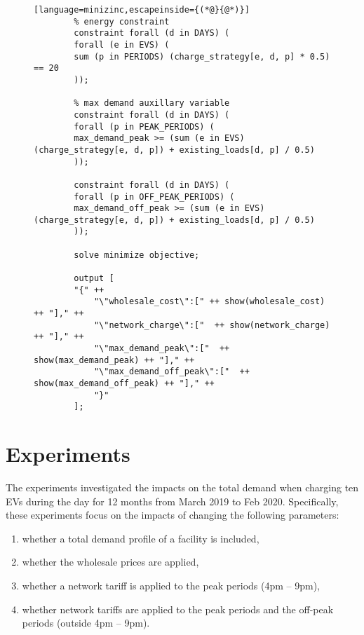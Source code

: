 \documentclass[a4paper, oneandhalfspace]{llncs}
\begin{document}
\begin{figure}[hp!]
\begin{lstlisting}[language=minizinc,escapeinside={(*@}{@*)}]
		% energy constraint
		constraint forall (d in DAYS) (
		forall (e in EVS) (
		sum (p in PERIODS) (charge_strategy[e, d, p] * 0.5) == 20
		));
		
		% max demand auxillary variable
		constraint forall (d in DAYS) (
		forall (p in PEAK_PERIODS) (
		max_demand_peak >= (sum (e in EVS) (charge_strategy[e, d, p]) + existing_loads[d, p] / 0.5)
		));
		
		constraint forall (d in DAYS) (
		forall (p in OFF_PEAK_PERIODS) (
		max_demand_off_peak >= (sum (e in EVS) (charge_strategy[e, d, p]) + existing_loads[d, p] / 0.5)
		));
		
		solve minimize objective;
		
		output [
		"{" ++
			"\"wholesale_cost\":[" ++ show(wholesale_cost) ++ "]," ++
			"\"network_charge\":["  ++ show(network_charge) ++ "]," ++
			"\"max_demand_peak\":["  ++ show(max_demand_peak) ++ "]," ++
			"\"max_demand_off_peak\":["  ++ show(max_demand_off_peak) ++ "]," ++
			"}"
		];
	\end{lstlisting}
\end{figure}


\section{Experiments}

The experiments investigated the impacts on the total demand when charging ten EVs during the day for 12 months from March 2019 to Feb 2020. Specifically, these experiments focus on the impacts of changing the following parameters:

\begin{enumerate}
	\item whether a total demand profile of a facility is included,
	\item whether the wholesale prices are applied,
	\item whether a network tariff is applied to the peak  periods (4pm -- 9pm),
	\item whether network tariffs are applied to the peak periods and the off-peak periods (outside 4pm -- 9pm).
\end{enumerate}
\end{document}
